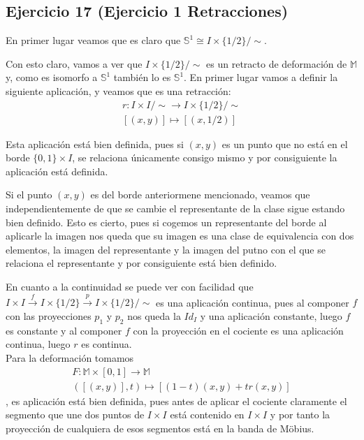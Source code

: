 \documentclass{article}
\begin{document}
\subsection{Ejercicio 17 (Ejercicio 1 Retracciones)}
En primer lugar veamos que es claro que $\mathbb{S}^1\cong I\times \{1/2\}/\sim$.

Con esto claro, vamos a ver que $I\times \{1/2\}/\sim$ es un retracto de deformación de $\mathbb{M}$ y, como es isomorfo a $\mathbb{S}^1$ también lo es $\mathbb{S}^1$. En primer lugar vamos a definir la siguiente aplicación, y veamos que es una retracción:
\begin{gather*}
r:I\times I/\sim \rightarrow I\times \{1/2\}/\sim\\
[(x,y)]\mapsto [(x,1/2)]
\end{gather*}

Esta aplicación está bien definida, pues si $(x,y)$ es un punto que no está en el borde $\{0,1\}\times I$, se relaciona únicamente consigo mismo y por consiguiente la aplicación está definida.

Si el punto $(x,y)$ es del borde anteriormene mencionado, veamos que independientemente de que se cambie el representante de la clase sigue estando bien definido. Esto es cierto, pues si cogemos un representante del borde al aplicarle la imagen nos queda que su imagen es una clase de equivalencia con dos elementos, la imagen del representante y la imagen del putno con el que se relaciona el representante y por consiguiente está bien definido.

En cuanto a la continuidad se puede ver con facilidad que $I\times I \xrightarrow{f} I\times \{1/2\}\xrightarrow{p}I\times\{1/2\}/\sim$ es una aplicación continua, pues al componer $f$ con las proyecciones $p_1$ y $p_2$ nos queda la $Id_I$ y una aplicación constante, luego $f$ es constante y al componer $f$ con la proyección en el cociente es una aplicación continua, luego $r$ es continua.\\

Para la deformación tomamos
\begin{gather*}
F:\mathbb{M}\times [0,1]\rightarrow \mathbb{M}\\
([(x,y)],t)\mapsto [(1-t)(x,y)+tr(x,y)]
\end{gather*}
, es aplicación está bien definida, pues antes de aplicar el cociente claramente el segmento que une dos puntos de $I\times I$ está contenido en $I\times I$ y por tanto la proyección de cualquiera de esos segmentos está en la banda de Möbius.
\end{document}

